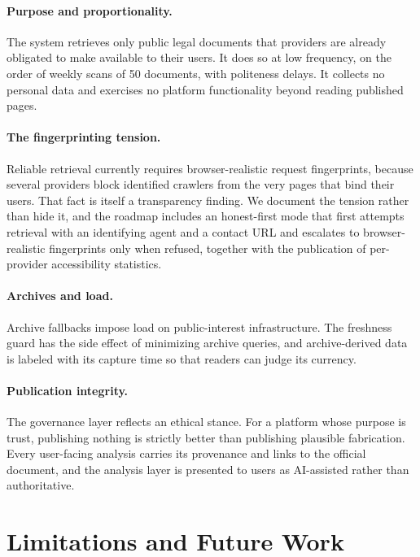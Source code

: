 \documentclass[11pt]{article}
\begin{document}
\paragraph{Purpose and proportionality.}
The system retrieves only public legal documents that providers are already
obligated to make available to their users. It does so at low frequency, on the
order of weekly scans of 50 documents, with politeness delays. It collects no
personal data and exercises no platform functionality beyond reading published
pages.

\paragraph{The fingerprinting tension.}
Reliable retrieval currently requires browser-realistic request fingerprints,
because several providers block identified crawlers from the very pages that bind
their users. That fact is itself a transparency finding. We document the tension
rather than hide it, and the roadmap includes an honest-first mode that first
attempts retrieval with an identifying agent and a contact URL and escalates to
browser-realistic fingerprints only when refused, together with the publication
of per-provider accessibility statistics.

\paragraph{Archives and load.}
Archive fallbacks impose load on public-interest infrastructure. The freshness
guard has the side effect of minimizing archive queries, and archive-derived data
is labeled with its capture time so that readers can judge its currency.

\paragraph{Publication integrity.}
The governance layer reflects an ethical stance. For a platform whose purpose is
trust, publishing nothing is strictly better than publishing plausible
fabrication. Every user-facing analysis carries its provenance and links to the
official document, and the analysis layer is presented to users as
AI-assisted rather than authoritative.

\section{Limitations and Future Work}
\label{sec:limits}
\end{document}

